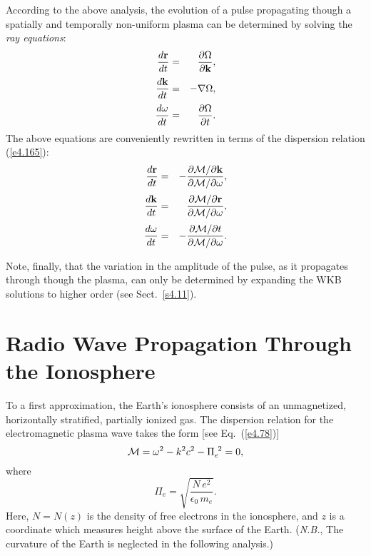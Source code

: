 According to the above analysis, the evolution of a pulse 
propagating though a spatially and temporally non-uniform
plasma can be determined  by solving the
{\em ray equations}:
\begin{eqnarray}
\frac{d{\bf r}}{dt} &=& \frac{\partial{\Omega}}{\partial {\bf k}},\\[0.5ex]
\frac{d{\bf k}}{dt} &=& -\nabla{\Omega},\\[0.5ex]
\frac{d\omega}{d t} &=& \frac{\partial{\Omega}}{\partial t}.
\end{eqnarray}
The above equations are conveniently rewritten in terms of the dispersion
relation (\ref{e4.165}):
\begin{eqnarray}\label{e4.177a}
\frac{d{\bf r}}{dt} &=& -\frac{\partial{\cal M}/\partial {\bf k} }
{\partial{\cal M}/\partial\omega},\\[0.5ex]
\frac{d{\bf k}}{dt} &=& \frac{\partial{\cal M}/\partial{\bf r} }
{\partial{\cal M}/\partial\omega},\\[0.5ex]
\frac{d\omega}{d t} &=& -\frac{\partial{\cal M}/\partial t }
{\partial{\cal M}/\partial\omega}.\label{e4.177c}
\end{eqnarray}

Note, finally, that the variation in the amplitude of the pulse, as it
propagates through though the plasma, can only be determined by expanding
the WKB solutions to higher order (see Sect.~\ref{s4.11}).

\section{Radio Wave Propagation Through the Ionosphere}
To a first approximation, the Earth's ionosphere consists of an unmagnetized,
horizontally stratified, partially ionized gas. The dispersion
relation for the electromagnetic plasma wave takes the form [see Eq.~(\ref{e4.78})]
\begin{equation}\label{e4.178}
{\cal M} = \omega^2 - k^2 c^2 - {\Pi}_e^{~2} = 0,
\end{equation}
where 
\begin{equation}
{\Pi}_e = \sqrt{\frac{N\,e^2}{\epsilon_0\,m_e}}.
\end{equation}
Here, $N=N(z)$ is the density of free electrons in the ionosphere, and
$z$ is a coordinate which measures height above the surface of the Earth. ({\em N.B.},
The curvature of the Earth is neglected in the following analysis.) 

